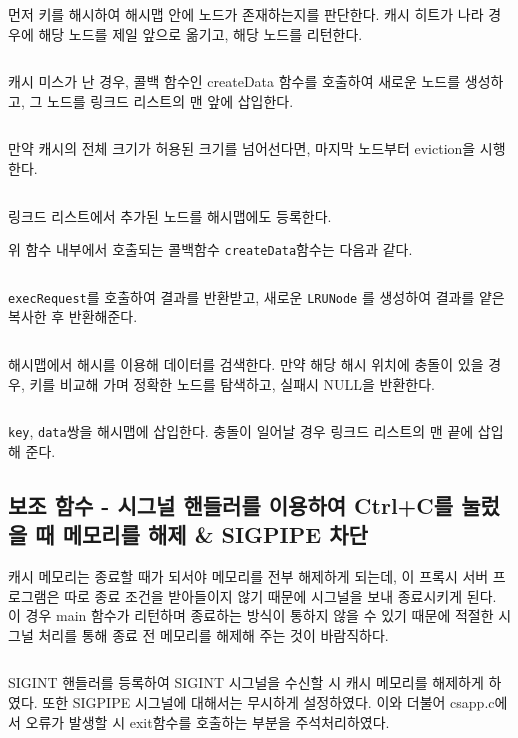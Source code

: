 \documentclass{report}
\begin{document}
\inputminted[firstline=41,lastline=57, linenos, breaklines]{C}{../submit/lrucache.c}
먼저 키를 해시하여 해시맵 안에 노드가 존재하는지를 판단한다. 캐시 히트가 나라 경우에 해당 노드를 제일 앞으로 옮기고, 해당 노드를 리턴한다.

\inputminted[firstline=58,lastline=69, linenos, breaklines]{C}{../submit/lrucache.c}
캐시 미스가 난 경우, 콜백 함수인 createData 함수를 호출하여 새로운 노드를 생성하고, 그 노드를 링크드 리스트의 맨 앞에 삽입한다.

\inputminted[firstline=70,lastline=102, linenos, breaklines]{C}{../submit/lrucache.c}
만약 캐시의 전체 크기가 허용된 크기를 넘어선다면, 마지막 노드부터 eviction을 시행한다.

\inputminted[firstline=103,lastline=107, linenos, breaklines]{C}{../submit/lrucache.c}
링크드 리스트에서 추가된 노드를 해시맵에도 등록한다.

위 함수 내부에서 호출되는 콜백함수 \lstinline{createData}함수는 다음과 같다.

\inputminted[firstline=118,lastline=134, linenos, breaklines]{C}{../submit/proxy.c}
\lstinline{execRequest}를 호출하여 결과를 반환받고, 새로운 \lstinline{LRUNode} 를 생성하여 결과를 얕은 복사한 후 반환해준다.

\inputminted[firstline=109,lastline=127, linenos, breaklines]{C}{../submit/lrucache.c}
해시맵에서 해시를 이용해 데이터를 검색한다. 만약 해당 해시 위치에 충돌이 있을 경우, 키를 비교해 가며 정확한 노드를 탐색하고, 실패시 NULL을 반환한다.

\inputminted[firstline=129,lastline=148, linenos, breaklines]{C}{../submit/lrucache.c}
\lstinline{key}, \lstinline{data}쌍을 해시맵에 삽입한다. 충돌이 일어날 경우 링크드 리스트의 맨 끝에 삽입해 준다.

\subsection{보조 함수 - 시그널 핸들러를 이용하여 Ctrl+C를 눌렀을 때 메모리를 해제 \& SIGPIPE 차단}
캐시 메모리는 종료할 때가 되서야 메모리를 전부 해제하게 되는데, 이 프록시 서버 프로그램은 따로 종료 조건을 받아들이지 않기 때문에 시그널을 보내 종료시키게 된다. 이 경우 main 함수가 리턴하며 종료하는 방식이 통하지 않을 수 있기 때문에 적절한 시그널 처리를 통해 종료 전 메모리를 해제해 주는 것이 바람직하다.
\inputminted[firstline=102,lastline=115, linenos, breaklines]{C}{../submit/proxy.c}
SIGINT 핸들러를 등록하여 SIGINT 시그널을 수신할 시 캐시 메모리를 해제하게 하였다. 또한 SIGPIPE 시그널에 대해서는 무시하게 설정하였다. 이와 더불어 csapp.c에서 오류가 발생할 시 exit함수를 호출하는 부분을 주석처리하였다.
\end{document}
